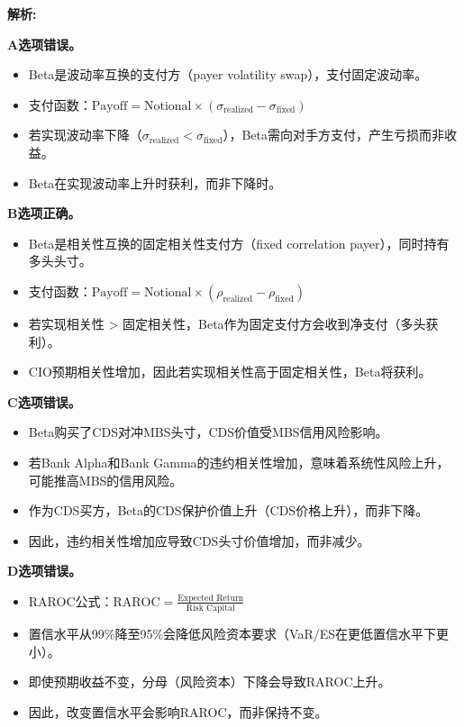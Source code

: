 \documentclass{article}
\newenvironment{explanation}
{\textbf{解析:}\par}
{\par}
\begin{document}
\begin{explanation}

    \textbf{A选项错误。}
    \begin{itemize}
        \item Beta是波动率互换的支付方（payer volatility swap），支付固定波动率。
        \item 支付函数：$\text{Payoff} = \text{Notional} \times (\sigma_{\text{realized}} - \sigma_{\text{fixed}})$
        \item 若实现波动率下降（$\sigma_{\text{realized}} < \sigma_{\text{fixed}}$），Beta需向对手方支付，产生亏损而非收益。
        \item Beta在实现波动率上升时获利，而非下降时。
    \end{itemize}

    \textbf{B选项正确。}
    \begin{itemize}
        \item Beta是相关性互换的固定相关性支付方（fixed correlation payer），同时持有多头头寸。
        \item 支付函数：$\text{Payoff} = \text{Notional} \times (\rho_{\text{realized}} - \rho_{\text{fixed}})$
        \item 若实现相关性 > 固定相关性，Beta作为固定支付方会收到净支付（多头获利）。
        \item CIO预期相关性增加，因此若实现相关性高于固定相关性，Beta将获利。
    \end{itemize}

    \textbf{C选项错误。}
    \begin{itemize}
        \item Beta购买了CDS对冲MBS头寸，CDS价值受MBS信用风险影响。
        \item 若Bank Alpha和Bank Gamma的违约相关性增加，意味着系统性风险上升，可能推高MBS的信用风险。
        \item 作为CDS买方，Beta的CDS保护价值上升（CDS价格上升），而非下降。
        \item 因此，违约相关性增加应导致CDS头寸价值增加，而非减少。
    \end{itemize}

    \textbf{D选项错误。}
    \begin{itemize}
        \item RAROC公式：$\text{RAROC} = \frac{\text{Expected Return}}{\text{Risk Capital}}$
        \item 置信水平从99\%降至95\%会降低风险资本要求（VaR/ES在更低置信水平下更小）。
        \item 即使预期收益不变，分母（风险资本）下降会导致RAROC上升。
        \item 因此，改变置信水平会影响RAROC，而非保持不变。
    \end{itemize}

\end{explanation}
\end{document}
